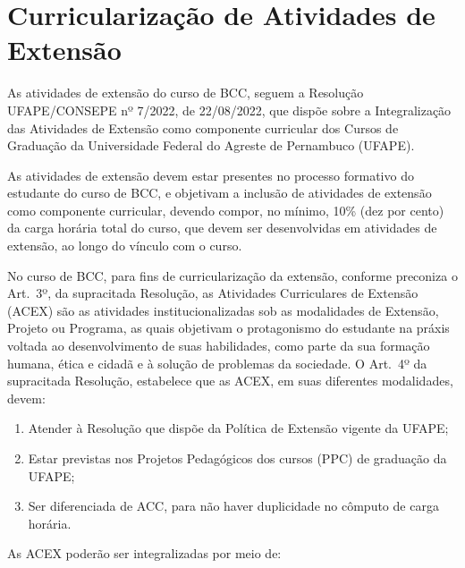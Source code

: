 \documentclass[
	12pt,				%
	openright,			%
  oneside,     %
	a4paper,			%
	english,			%
	french,				%
	spanish,			%
	brazil				%
	]{abntex2}
\begin{document}
%
%

\chapter{Curricularização de Atividades de Extensão}
\label{chap:curricularizacao-da-extensao}

As atividades de extensão do curso de BCC, seguem a Resolução UFAPE/CONSEPE nº 7/2022, de 22/08/2022, que dispõe sobre a Integralização das Atividades de Extensão como componente curricular dos Cursos de Graduação da Universidade Federal do Agreste de Pernambuco (UFAPE).

As atividades de extensão devem estar presentes no processo formativo do estudante do curso de BCC, e objetivam a inclusão de atividades de extensão como componente curricular, devendo compor, no mínimo, 10\% (dez por cento) da carga horária total do curso, que devem ser desenvolvidas em atividades de extensão, ao longo do vínculo com o curso.

No curso de BCC, para fins de curricularização da extensão, conforme preconiza o Art.~3º, da supracitada Resolução, as Atividades Curriculares de Extensão (ACEX) são as atividades institucionalizadas sob as modalidades de Extensão, Projeto ou Programa, as quais objetivam o protagonismo do estudante na práxis voltada ao desenvolvimento de suas habilidades, como parte da sua formação humana, ética e cidadã e à solução de problemas da sociedade. O Art.~4º da supracitada Resolução, estabelece que as ACEX, em suas diferentes modalidades, devem:

\begin{enumerate}[label=\Roman*.]
   \item Atender à Resolução que dispõe da Política de Extensão vigente da UFAPE;
   \item Estar previstas nos Projetos Pedagógicos dos cursos (PPC) de graduação da UFAPE;
   \item Ser diferenciada de ACC, para não haver duplicidade no cômputo de carga horária.
\end{enumerate}
  
As ACEX poderão ser integralizadas por meio de:
\end{document}
